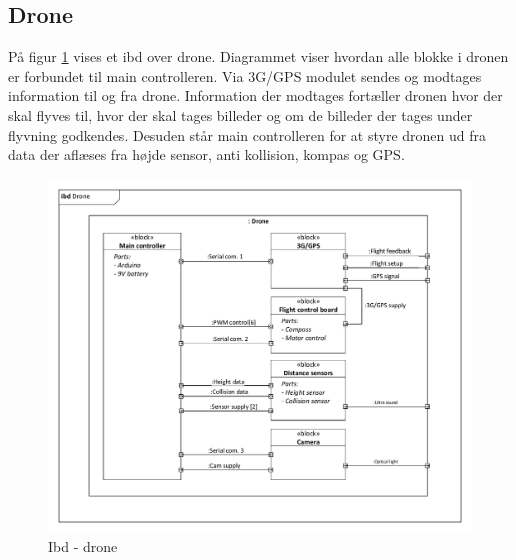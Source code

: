 \subsection{Drone}

På figur \ref{fig:ibd_drone} vises et ibd over drone. Diagrammet viser hvordan alle blokke i dronen er forbundet til main controlleren. Via 3G/GPS modulet sendes og modtages information til og fra drone. Information der modtages fortæller dronen hvor der skal flyves til, hvor der skal tages billeder og om de billeder der tages under flyvning godkendes. Desuden står main controlleren for at styre dronen ud fra data der aflæses fra højde sensor, anti kollision, kompas og GPS. 

\begin{figure}[H]
\centering
\includegraphics[width=1\textwidth]{Billeder/IBD/ibd2_drone.pdf}
\vspace{-1cm}
\caption{Ibd - drone}
\label{fig:ibd_drone}
\end{figure}

